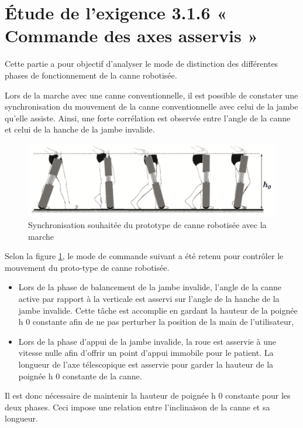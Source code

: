 
\section{Étude de l'exigence 3.1.6 « Commande des axes asservis »}
Cette partie a pour objectif d'analyser le mode de distinction des différentes phases de fonctionnement de la canne robotisée.

Lors de la marche avec une canne conventionnelle, il est possible de constater une synchronisation du mouvement de la canne conventionnelle avec celui de la jambe qu'elle assiste. Ainsi, une forte corrélation est observée entre l'angle de la canne et celui de la hanche de la jambe invalide.

\begin{figure}[!h]\centering
\includegraphics[width=0.7\linewidth]{img/fig_11_sujet_init}
\caption{\label{repsat}Synchronisation souhaitée du prototype de canne robotisée avec la marche}
\end{figure}

Selon la figure \ref{repsat}, le mode de commande suivant a été retenu pour contrôler le mouvement du proto-type de canne robotisée.
\begin{itemize}
 \item Lors de la phase de balancement de la jambe invalide, l'angle de la canne active par rapport à la verticale est asservi sur l'angle de la hanche de la jambe invalide. Cette tâche est accomplie
en gardant la hauteur de la poignée h 0 constante afin de ne pas perturber la position de la main
de l'utilisateur,
 \item Lors de la phase d'appui de la jambe invalide, la roue est asservie à une vitesse nulle afin d'offrir un point d'appui immobile pour le patient. La longueur de l'axe télescopique est asservie pour garder la hauteur de la poignée h 0 constante de la canne.
\end{itemize}

Il est donc nécessaire de maintenir la hauteur de poignée h 0 constante pour les deux phases. Ceci
impose une relation entre l'inclinaison de la canne et sa longueur.

